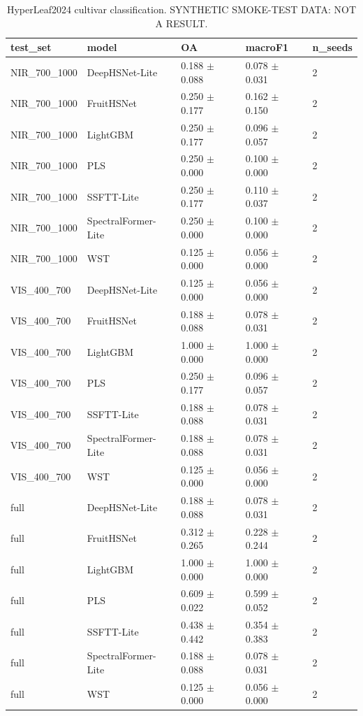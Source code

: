 \begin{table}[t]
\centering
\caption{HyperLeaf2024 cultivar classification. SYNTHETIC SMOKE-TEST DATA: NOT A RESULT.}
\label{tab:table_hyperleaf_cultivar}
\begin{tabular}{lllll}
\hline
test\_set & model & OA & macroF1 & n\_seeds \\
\hline
NIR\_700\_1000 & DeepHSNet-Lite & 0.188 $\pm$ 0.088 & 0.078 $\pm$ 0.031 & 2 \\
NIR\_700\_1000 & FruitHSNet & 0.250 $\pm$ 0.177 & 0.162 $\pm$ 0.150 & 2 \\
NIR\_700\_1000 & LightGBM & 0.250 $\pm$ 0.177 & 0.096 $\pm$ 0.057 & 2 \\
NIR\_700\_1000 & PLS & 0.250 $\pm$ 0.000 & 0.100 $\pm$ 0.000 & 2 \\
NIR\_700\_1000 & SSFTT-Lite & 0.250 $\pm$ 0.177 & 0.110 $\pm$ 0.037 & 2 \\
NIR\_700\_1000 & SpectralFormer-Lite & 0.250 $\pm$ 0.000 & 0.100 $\pm$ 0.000 & 2 \\
NIR\_700\_1000 & WST & 0.125 $\pm$ 0.000 & 0.056 $\pm$ 0.000 & 2 \\
VIS\_400\_700 & DeepHSNet-Lite & 0.125 $\pm$ 0.000 & 0.056 $\pm$ 0.000 & 2 \\
VIS\_400\_700 & FruitHSNet & 0.188 $\pm$ 0.088 & 0.078 $\pm$ 0.031 & 2 \\
VIS\_400\_700 & LightGBM & 1.000 $\pm$ 0.000 & 1.000 $\pm$ 0.000 & 2 \\
VIS\_400\_700 & PLS & 0.250 $\pm$ 0.177 & 0.096 $\pm$ 0.057 & 2 \\
VIS\_400\_700 & SSFTT-Lite & 0.188 $\pm$ 0.088 & 0.078 $\pm$ 0.031 & 2 \\
VIS\_400\_700 & SpectralFormer-Lite & 0.188 $\pm$ 0.088 & 0.078 $\pm$ 0.031 & 2 \\
VIS\_400\_700 & WST & 0.125 $\pm$ 0.000 & 0.056 $\pm$ 0.000 & 2 \\
full & DeepHSNet-Lite & 0.188 $\pm$ 0.088 & 0.078 $\pm$ 0.031 & 2 \\
full & FruitHSNet & 0.312 $\pm$ 0.265 & 0.228 $\pm$ 0.244 & 2 \\
full & LightGBM & 1.000 $\pm$ 0.000 & 1.000 $\pm$ 0.000 & 2 \\
full & PLS & 0.609 $\pm$ 0.022 & 0.599 $\pm$ 0.052 & 2 \\
full & SSFTT-Lite & 0.438 $\pm$ 0.442 & 0.354 $\pm$ 0.383 & 2 \\
full & SpectralFormer-Lite & 0.188 $\pm$ 0.088 & 0.078 $\pm$ 0.031 & 2 \\
full & WST & 0.125 $\pm$ 0.000 & 0.056 $\pm$ 0.000 & 2 \\

\end{tabular}
\end{table}

